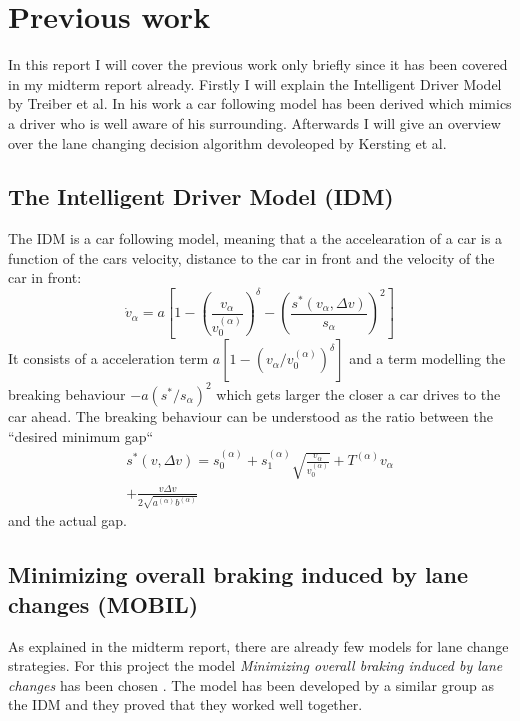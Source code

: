 \section{Previous work}
\label{sec:previous_work}
In this report I will cover the previous work only briefly since it has been covered in my midterm report already.
Firstly I will explain the Intelligent Driver Model by Treiber et al. In his work a car following model has been derived
which mimics a driver who is well aware of his surrounding. Afterwards I will give an overview over the lane changing
decision algorithm devoleoped by Kersting et al.

\subsection{The Intelligent Driver Model (IDM)}
\label{sec:idm}
The IDM is a car following model, meaning that a the accelearation of a car is a function of the cars velocity,
distance to the car in front and the velocity of the car in front:
\begin{equation}
  \dot v_\alpha = a \left[1 - \left(\frac{v_\alpha}{v_0^{(\alpha)}}\right)^\delta -
    \left(\frac{s^*(v_\alpha, \Delta v)}{s_\alpha}\right)^2
  \right]
  \label{eqn:idm:sprime}
\end{equation}
It consists of a acceleration term $a [1 - (v_\alpha / v_0^{(\alpha)})^\delta]$ and a term modelling the breaking
behaviour $-a (s^* / s_\alpha)^2$ which gets larger the closer a car drives to the car ahead. The breaking behaviour
can be understood as the ratio between the ``desired minimum gap``
\begin{multline}
  s^*(v, \Delta v) = s_0^{(\alpha)} + s_1^{(\alpha)} \sqrt{\frac{v_\alpha}{v_0^{(\alpha)}}} + T^{(\alpha)}v_\alpha
  \\
  + \frac{v\Delta v}{2 \sqrt{a^{(\alpha)} b^{(\alpha)}}}
\end{multline}
and the actual gap.

\subsection{Minimizing overall braking induced by lane changes (MOBIL)}
\label{sec:mobil}
As explained in the midterm report, there are already few  models for lane change strategies. 
For this project the model 
\textit{Minimizing overall braking induced by lane changes} has been chosen \cite{MOBIL}. 
The model has been developed by
a similar group as the IDM and they proved that they worked well together. 

